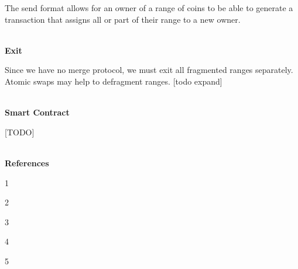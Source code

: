 \documentclass[11pt]{article}
\begin{document}
The send format allows for an owner of a range of coins to be able to generate a transaction that assigns all or part of their range to a new owner. 
\\
\\
\centerline{\textbf{Exit}}

Since we have no merge protocol, we must exit all fragmented ranges separately. Atomic swaps may help to defragment ranges. [todo expand]
\\
\\
\centerline{\textbf{Smart Contract}}

[TODO]
\\
\\
\centerline{\textbf{References}}

1 \url{}

2 \url{}

3 \url{}

4 \url{}

5 \url{}
\end{document}

